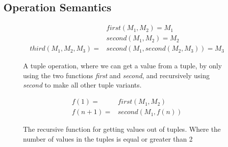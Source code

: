 \subsection{Operation Semantics}

\begin{figure}[h]
\begin{center}
\begin{align*}
	&first(M_1,M_2)=M_1\\
	&second(M_1,M_2)=M_2\\
	third(M_1,M_2,M_3)=&second(M_1,second(M_2,M_3))=M_3
\end{align*}
\end{center}
\caption{A tuple operation, where we can get a value from a tuple, by only using the two functions \textit{first} and \textit{second}, and recursively using \textit{second} to make all other tuple variants.}
\end{figure}

\begin{figure}[h]
\begin{center}
\begin{align*}
	f(1) =& first(M_1, M_2)\\
	f(n+1) =& second(M_1, f(n))
\end{align*}
\end{center}
\caption{The recursive function for getting values out of tuples. Where the number of values in the tuples is equal or greater than 2}
\end{figure}

\FloatBarrier